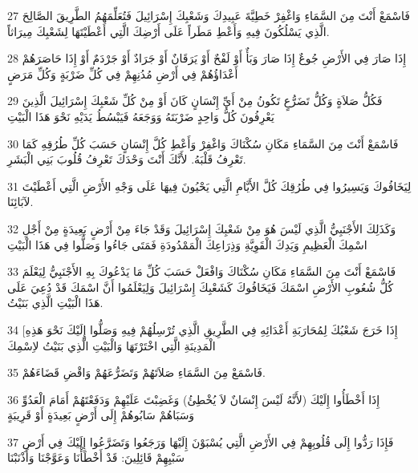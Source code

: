 \par 27 فَاسْمَعْ أَنْتَ مِنَ السَّمَاءِ وَاغْفِرْ خَطِيَّةَ عَبِيدِكَ وَشَعْبِكَ إِسْرَائِيلَ فَتُعَلِّمَهُمُ الطَّرِيقَ الصَّالِحَ الَّذِي يَسْلُكُونَ فِيهِ وَأَعْطِ مَطَراً عَلَى أَرْضِكَ الَّتِي أَعْطَيْتَهَا لِشَعْبِكَ مِيرَاثاً.
\par 28 إِذَا صَارَ فِي الأَرْضِ جُوعٌ إِذَا صَارَ وَبَأٌ أَوْ لَفْحٌ أَوْ يَرَقَانٌ أَوْ جَرَادٌ أَوْ جَرْدَمٌ أَوْ إِذَا حَاصَرَهُمْ أَعْدَاؤُهُمْ فِي أَرْضِ مُدُنِهِمْ فِي كُلِّ ضَرْبَةٍ وَكُلِّ مَرَضٍ
\par 29 فَكُلُّ صَلاَةٍ وَكُلُّ تَضَرُّعٍ تَكُونُ مِنْ أَيِّ إِنْسَانٍ كَانَ أَوْ مِنْ كُلِّ شَعْبِكَ إِسْرَائِيلَ الَّذِينَ يَعْرِفُونَ كُلُّ وَاحِدٍ ضَرْبَتَهُ وَوَجَعَهُ فَيَبْسُطُ يَدَيْهِ نَحْوَ هَذَا الْبَيْتِ
\par 30 فَاسْمَعْ أَنْتَ مِنَ السَّمَاءِ مَكَانِ سُكْنَاكَ وَاغْفِرْ وَأَعْطِ كُلَّ إِنْسَانٍ حَسَبَ كُلِّ طُرُقِهِ كَمَا تَعْرِفُ قَلْبَهُ. لأَنَّكَ أَنْتَ وَحْدَكَ تَعْرِفُ قُلُوبَ بَنِي الْبَشَرِ.
\par 31 لِيَخَافُوكَ وَيَسِيرُوا فِي طُرُقِكَ كُلَّ الأَيَّامِ الَّتِي يَحْيُونَ فِيهَا عَلَى وَجْهِ الأَرْضِ الَّتِي أَعْطَيْتَ لآبَائِنَا.
\par 32 وَكَذَلِكَ الأَجْنَبِيُّ الَّذِي لَيْسَ هُوَ مِنْ شَعْبِكَ إِسْرَائِيلَ وَقَدْ جَاءَ مِنْ أَرْضٍ بَعِيدَةٍ مِنْ أَجْلِ اسْمِكَ الْعَظِيمِ وَيَدِكَ الْقَوِيَّةِ وَذِرَاعِكَ الْمَمْدُودَةِ فَمَتَى جَاءُوا وَصَلُّوا فِي هَذَا الْبَيْتِ
\par 33 فَاسْمَعْ أَنْتَ مِنَ السَّمَاءِ مَكَانِ سُكْنَاكَ وَافْعَلْ حَسَبَ كُلِّ مَا يَدْعُوكَ بِهِ الأَجْنَبِيُّ لِيَعْلَمَ كُلُّ شُعُوبِ الأَرْضِ اسْمَكَ فَيَخَافُوكَ كَشَعْبِكَ إِسْرَائِيلَ وَلِيَعْلَمُوا أَنَّ اسْمَكَ قَدْ دُعِيَ عَلَى هَذَا الْبَيْتِ الَّذِي بَنَيْتُ.
\par 34 [إِذَا خَرَجَ شَعْبُكَ لِمُحَارَبَةِ أَعْدَائِهِ فِي الطَّرِيقِ الَّذِي تُرْسِلُهُمْ فِيهِ وَصَلُّوا إِلَيْكَ نَحْوَ هَذِهِ الْمَدِينَةِ الَّتِي اخْتَرْتَهَا وَالْبَيْتِ الَّذِي بَنَيْتُ لاِسْمِكَ
\par 35 فَاسْمَعْ مِنَ السَّمَاءِ صَلاَتَهُمْ وَتَضَرُّعَهُمْ وَاقْضِ قَضَاءَهُمْ.
\par 36 إِذَا أَخْطَأُوا إِلَيْكَ (لأَنَّهُ لَيْسَ إِنْسَانٌ لاَ يُخْطِئُ) وَغَضِبْتَ عَلَيْهِمْ وَدَفَعْتَهُمْ أَمَامَ الْعَدُوِّ وَسَبَاهُمْ سَابُوهُمْ إِلَى أَرْضٍ بَعِيدَةٍ أَوْ قَرِيبَةٍ
\par 37 فَإِذَا رَدُّوا إِلَى قُلُوبِهِمْ فِي الأَرْضِ الَّتِي يُسْبَوْنَ إِلَيْهَا وَرَجَعُوا وَتَضَرَّعُوا إِلَيْكَ فِي أَرْضِ سَبْيِهِمْ قَائِلِينَ: قَدْ أَخْطَأْنَا وَعَوَّجْنَا وَأَذْنَبْنَا
